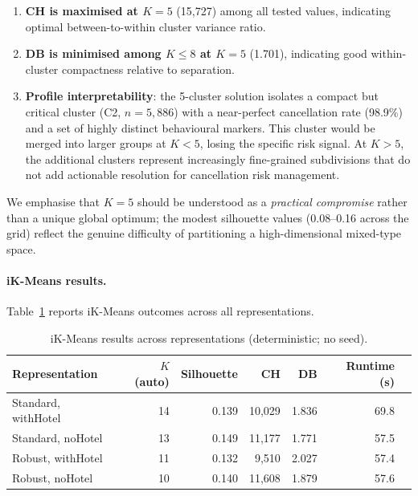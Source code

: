 \documentclass[12pt,a4paper]{article}
\begin{document}
\begin{enumerate}[noitemsep]
  \item \textbf{CH is maximised at $K=5$} (15,727) among all tested
        values, indicating optimal between-to-within cluster variance ratio.
  \item \textbf{DB is minimised among $K \leq 8$ at $K=5$} (1.701),
        indicating good within-cluster compactness relative to separation.
  \item \textbf{Profile interpretability}: the 5-cluster solution isolates
        a compact but critical cluster (C2, $n=5{,}886$) with a near-perfect
        cancellation rate (98.9\%) and a set of highly distinct behavioural
        markers. This cluster would be merged into larger groups at $K < 5$,
        losing the specific risk signal. At $K > 5$, the additional clusters
        represent increasingly fine-grained subdivisions that do not add
        actionable resolution for cancellation risk management.
\end{enumerate}

We emphasise that $K=5$ should be understood as a \emph{practical compromise}
rather than a unique global optimum; the modest silhouette values
(0.08--0.16 across the grid) reflect the genuine difficulty of partitioning
a high-dimensional mixed-type space.

\paragraph{iK-Means results.}
Table~\ref{tab:ikm} reports iK-Means outcomes across all representations.

\begin{table}[H]
  \centering
  \caption{iK-Means results across representations (deterministic; no seed).}
  \label{tab:ikm}
  \small
  \begin{tabular}{@{}lrrrrrr@{}}
    \toprule
    Representation & $K$ (auto) & Silhouette & CH & DB & Runtime (s) \\
    \midrule
    Standard, withHotel & 14 & 0.139 & 10,029 & 1.836 & 69.8 \\
    Standard, noHotel   & 13 & 0.149 & 11,177 & 1.771 & 57.5 \\
    Robust, withHotel   & 11 & 0.132 & 9,510  & 2.027 & 57.4 \\
    Robust, noHotel     & 10 & 0.140 & 11,608 & 1.879 & 57.6 \\
    \bottomrule
  \end{tabular}
\end{table}
\end{document}
